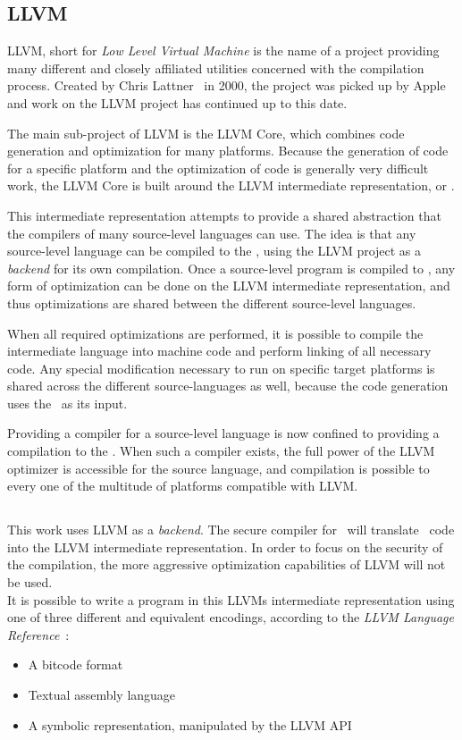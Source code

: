 \subsection{LLVM}
LLVM, short for \emph{Low Level Virtual Machine} is the name of a project providing many different and closely affiliated utilities concerned with the compilation process.
Created by Chris Lattner~\cite{Lattner} in 2000, the project was picked up by Apple and work on the LLVM project has continued up to this date.

The main sub-project of LLVM is the LLVM Core, which combines code generation and optimization for many platforms.
Because the generation of code for a specific platform and the optimization of code is generally very difficult work, the LLVM Core is built around the LLVM intermediate representation, or \LLVMIR.

This intermediate representation attempts to provide a shared abstraction that the compilers of many source-level languages can use.
The idea is that any source-level language can be compiled to the \LLVMIR, using the LLVM project as a \emph{backend} for its own compilation.
Once a source-level program is compiled to \LLVMIR, any form of optimization can be done on the LLVM intermediate representation, and thus optimizations are shared between the different source-level languages.

When all required optimizations are performed, it is possible to compile the intermediate language into machine code and perform linking of all necessary code.
Any special modification necessary to run on specific target platforms is shared across the 
different source-languages as well, because the code generation uses the \LLVMIR\ as its input.

Providing a compiler for a source-level language is now confined to providing a compilation to the \LLVMIR.
When such a compiler exists, the full power of the LLVM optimizer is accessible for the source language, and compilation is possible to every one of the multitude of platforms compatible with LLVM.

\subsection{\LLVMIR}
This work uses LLVM as a \emph{backend}.
The secure compiler for \MiniML\ will translate \MiniML\ code into the LLVM intermediate representation.
In order to focus on the security of the compilation, the more aggressive optimization capabilities of LLVM will not be used.
\\[1em]
It is possible to write a program in this LLVMs intermediate representation using one of three different and equivalent encodings, according to the \emph{LLVM Language Reference}~\cite{LLVMFAQ}:
\begin{itemize}
\item A bitcode format
\item Textual assembly language
\item A symbolic representation, manipulated by the LLVM API
\end{itemize}

